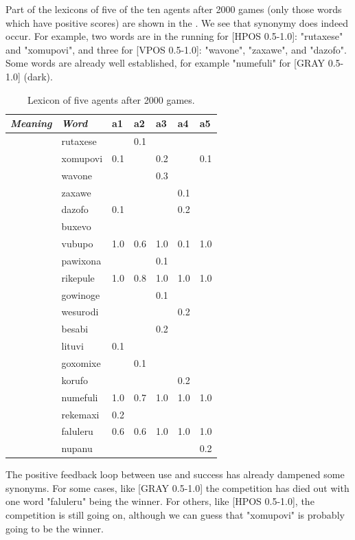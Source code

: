 Part of the lexicons of five of the ten agents after 2000 games 
(only those words which have positive scores) are shown in the 
. We see that synonymy does indeed occur. For
example, two words are in the 
running for [HPOS 0.5-1.0]: "rutaxese" and "xomupovi", and 
three for [VPOS 0.5-1.0]: "wavone", "zaxawe", and 
"dazofo". Some words are already well established, for
example "numefuli" for [GRAY 0.5-1.0] (dark). 
\begin{table}
\begin{center}
\begin{tabular}{ l  l  l  l  l  l  l  } \midrule
{\it Meaning}&{\it Word}&{\bf a1}&{\bf a2}&{\bf a3}&{\bf a4}&{\bf a5} \\ \midrule
[HPOS 0.5-1.0]&rutaxese& &0.1& & &\\ \midrule
 & xomupovi&0.1& &0.2& &0.1\\ \midrule
[VPOS 0.5-1.0]&wavone& & &0.3& &\\ \midrule
 & zaxawe& & & &0.1& \\ \midrule
 & dazofo&0.1& & &0.2&\\ \midrule
[WIDTH 0.0-0.5]&buxevo& & & & & \\ \midrule
 & vubupo&1.0&0.6&1.0&0.1&1.0\\ \midrule
[WIDTH 0.5-1.0]&pawixona& & &0.1& & \\ \midrule
 & rikepule&1.0&0.8&1.0&1.0&1.0\\ \midrule
[WIDTH 0.5-0.75]&gowinoge& & &0.1& &  \\ \midrule
 & wesurodi& & & &0.2&\\ \midrule
[WIDTH 0.75-1.0]&besabi& & &0.2& & \\ \midrule
 & lituvi&0.1& & & & \\ \midrule
[GRAY 0.5-0.75]&goxomixe& &0.1& & & \\ \midrule
 & korufo& & & &0.2&\\ \midrule
[GRAY 0.0-0.5]&numefuli&1.0&0.7&1.0&1.0&1.0\\ \midrule
[GRAY 0.0-0.25]&rekemaxi&0.2& & & & \\ \midrule
[GRAY 0.5-1.0]&faluleru&0.6&0.6&1.0&1.0&1.0\\ \midrule
 & nupanu& & & & &0.2 \\ \midrule
\end{tabular}
\caption{\label{tab:lex2000} Lexicon of five agents after 2000 games.}
\end{center}
\end{table}

The positive feedback loop between use and success
has already dampened some synonyms. For some cases, like [GRAY 0.5-1.0] the competition has died out 
with one word "faluleru" being the winner. 
For others, like [HPOS 0.5-1.0], the competition 
is still going on, although we can guess
that "xomupovi" is probably going to be the winner. 

